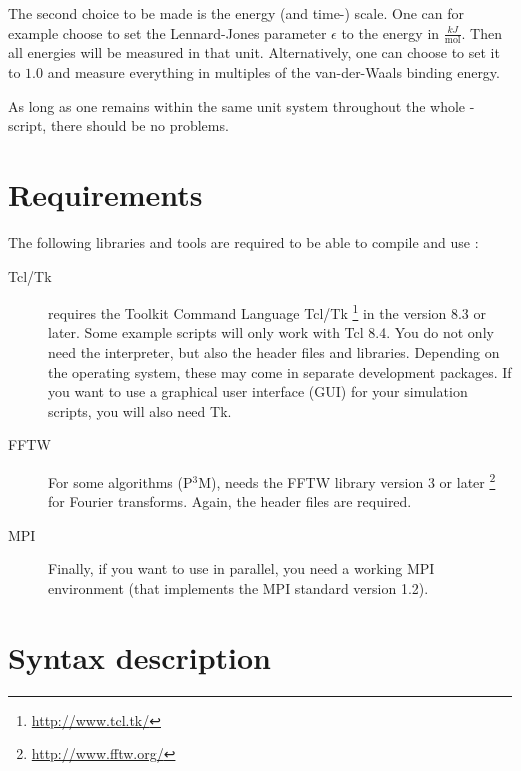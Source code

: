The second choice to be made is the energy (and time-) scale.  One can
for example choose to set the Lennard-Jones parameter $\epsilon$ to
the energy in $\frac{kJ}{\mathrm{mol}}$.  Then all energies will be
measured in that unit.  Alternatively, one can choose to set it to
$1.0$ and measure everything in multiples of the van-der-Waals binding
energy.

As long as one remains within the same unit system throughout the
whole \es-script, there should be no problems.

\section{Requirements}
\label{sec:requirements}

The following libraries and tools are required to be able to compile
and use \es:

\begin{description}
\item[Tcl/Tk]  \es{} requires the Toolkit Command
  Language Tcl/Tk \footnote{\url{http://www.tcl.tk/}} in the version
  8.3 or later.  Some example scripts will only work with Tcl 8.4. You
  do not only need the interpreter, but also the header files and
  libraries.  Depending on the operating system, these may come in
  separate development packages. If you want to use a graphical user
  interface (GUI) for your simulation scripts, you will also need Tk.
  
\item[FFTW]  For some algorithms (\eg P$^3$M), \es needs
  the FFTW library version 3 or later
  \footnote{\url{http://www.fftw.org/}} for Fourier transforms.
  Again, the header files are required.
  
\item[MPI]  Finally, if you want to use \es in parallel,
  you need a working MPI environment (that implements the MPI standard
  version 1.2).
\end{description}


\section{Syntax description}
\label{sec:syntax}


